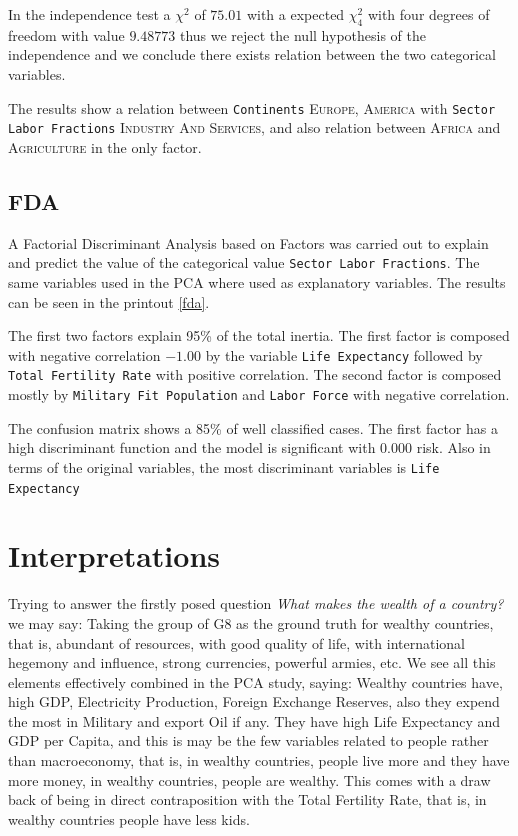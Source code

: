 \documentclass[a4paper,10pt,twocolumn]{article}
\begin{document}
In the independence test a $\chi^2$ of $75.01$ with a expected $\chi_4^2$ with four degrees of freedom with value $9.48773$ thus we reject the null hypothesis of the independence and we conclude there exists relation between the two categorical variables. 

The results show a relation between \texttt{Continents} \textsc{Europe, America} with \texttt{Sector Labor Fractions} \textsc{Industry And Services}, and also relation between \textsc{Africa} and \textsc{Agriculture} in the only factor. 


\subsection{FDA}

A Factorial Discriminant Analysis based on Factors was carried out to explain and predict the value of the categorical value \texttt{Sector Labor Fractions}. The same variables used in the PCA where used as explanatory variables. The results can be seen in the printout \ref{fda}.

The first two factors explain 95\% of the total inertia. The first factor is composed with negative correlation $-1.00$ by the variable \texttt{Life Expectancy} followed by \texttt{Total Fertility Rate} with positive correlation. The second factor is composed mostly by \texttt{Military Fit Population} and \texttt{Labor Force} with negative correlation. 

The confusion matrix shows a 85\% of well classified cases. The first factor has a high discriminant function and the model is significant with $0.000$ risk. Also in terms of the original variables, the most discriminant variables is \texttt{Life Expectancy}


\section{Interpretations}

Trying to answer the firstly posed question \emph{What makes the wealth of a country?} we may say: Taking the group of \textsc{G8} as the ground truth for wealthy countries, that is, abundant of resources, with good quality of life, with international hegemony and influence, strong currencies, powerful armies, etc. We see all this elements effectively combined in the PCA study, saying: Wealthy countries have, high GDP, Electricity Production, Foreign Exchange Reserves, also they expend the most in Military and export Oil if any. They have high Life Expectancy and GDP per Capita, and this is may be the few variables related to people rather than macroeconomy, that is, in wealthy countries, people live more and they have more money, in wealthy countries, people are wealthy. This comes with a draw back of being in direct contraposition with the Total Fertility Rate, that is, in wealthy countries people have less kids. 
\end{document}
